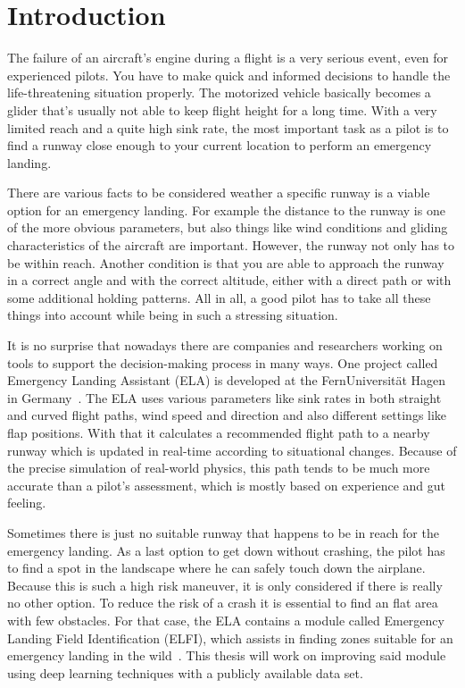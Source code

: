 \section{Introduction}
The failure of an aircraft's engine during a flight is a very serious event, even for experienced pilots. You have to make quick and informed decisions to handle the life-threatening situation properly. The motorized vehicle basically becomes a glider that's usually not able to keep flight height for a long time. With a very limited reach and a quite high sink rate, the most important task as a pilot is to find a runway close enough to your current location to perform an emergency landing.

There are various facts to be considered weather a specific runway is a viable option for an emergency landing. For example the distance to the runway is one of the more obvious parameters, but also things like wind conditions and gliding characteristics of the aircraft are important. However, the runway not only has to be within reach. Another condition is that you are able to approach the runway in a correct angle and with the correct altitude, either with a direct path or with some additional holding patterns. All in all, a good pilot has to take all these things into account while being in such a stressing situation.

It is no surprise that nowadays there are companies and researchers working on tools to support the decision-making process in many ways. One project called Emergency Landing Assistant (ELA) is developed at the FernUniversität Hagen in Germany~\cite{feu_fas}. The ELA uses various parameters like sink rates in both straight and curved flight paths, wind speed and direction and also different settings like flap positions. With that it calculates a recommended flight path to a nearby runway which is updated in real-time according to situational changes. Because of the precise simulation of real-world physics, this path tends to be much more accurate than a pilot's assessment, which is mostly based on experience and gut feeling.

Sometimes there is just no suitable runway that happens to be in reach for the emergency landing. As a last option to get down without crashing, the pilot has to find a spot in the landscape where he can safely touch down the airplane. Because this is such a high risk maneuver, it is only considered if there is really no other option. To reduce the risk of a crash it is essential to find an flat area with few obstacles. For that case, the ELA contains a module called Emergency Landing Field Identification (ELFI), which assists in finding zones suitable for an emergency landing in the wild~\cite{feu_elfi}. This thesis will work on improving said module using deep learning techniques with a publicly available data set.

